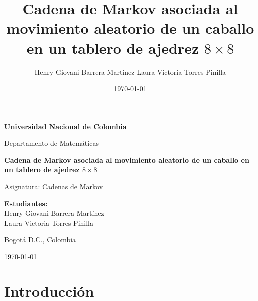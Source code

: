 \documentclass[12pt,a4paper]{article}
\title{
    \textbf{Cadena de Markov asociada al movimiento aleatorio de un caballo en un tablero de ajedrez \(8\times8\)}
}
\author{
    Henry Giovani Barrera Martínez
    Laura Victoria Torres Pinilla
}
\date{\today}
\begin{document}

\begin{titlepage}

    \centering

    \vspace*{2cm}

    {\Large \textbf{Universidad Nacional de Colombia}\par}

    \vspace{0.5cm}

    {\large Departamento de Matemáticas\par}

    \vspace{2cm}

    {\LARGE
    \textbf{Cadena de Markov asociada al movimiento aleatorio de un caballo en un tablero de ajedrez \(8\times8\)}
    \par}

    \vspace{1.5cm}

    {\large Asignatura: Cadenas de Markov\par}

    \vspace{2cm}

    {\large
    \textbf{Estudiantes:}\\
        Henry Giovani Barrera Martínez\\
        Laura Victoria Torres Pinilla
    \par}

    \vfill

    {\large Bogotá D.C., Colombia\par}

    {\large \today\par}

\end{titlepage}


\tableofcontents

\newpage


\section{Introducción}
\end{document}
